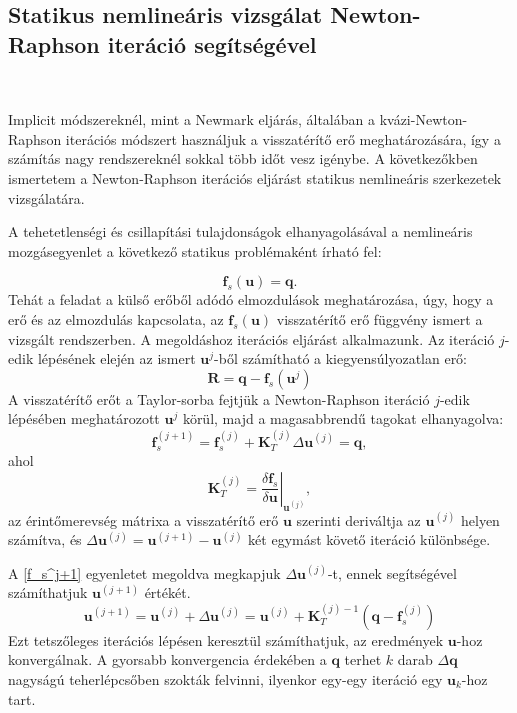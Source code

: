 \subsection{Statikus nemlineáris vizsgálat Newton-Raphson iteráció segítségével}

{\ }

 Implicit módszereknél, mint a Newmark eljárás, általában a kvázi-Newton-Raphson iterációs módszert \cite{chopra} használjuk a visszatérítő erő meghatározására, így a számítás nagy rendszereknél sokkal több időt vesz igénybe. A következőkben ismertetem a Newton-Raphson  iterációs eljárást statikus nemlineáris szerkezetek vizsgálatára.

A tehetetlenségi és csillapítási tulajdonságok elhanyagolásával a nemlineáris mozgásegyenlet a következő statikus problémaként írható fel:

\begin{equation*}
\mathbf{f}_s(\mathbf{u}) = \mathbf{q}.
\end{equation*}
Tehát a feladat a külső erőből adódó  elmozdulások meghatározása, úgy, hogy a erő és az elmozdulás kapcsolata, az $\mathbf{f}_s(\mathbf{u})$ visszatérítő erő függvény ismert a vizsgált rendszerben. A megoldáshoz iterációs eljárást alkalmazunk. Az iteráció $j$-edik lépésének elején  az ismert $\mathbf{u}^j$-ből számítható a kiegyensúlyozatlan erő:
\begin{equation*}
\mathbf{R} = \mathbf{q}-\mathbf{f}_s(\mathbf{u}^j)
\end{equation*}
 A visszatérítő erőt a   Taylor-sorba fejtjük a Newton-Raphson iteráció $j$-edik lépésében meghatározott $\mathbf{u}^j$ körül, majd a magasabbrendű tagokat elhanyagolva:
\begin{equation}
\label{f_s^j+1}
\mathbf{f}_s^{(j+1)} = \mathbf{f}_s^{(j)}+\mathbf{K}_T^{(j)}\Delta{\mathbf{u}}^{(j)} = \mathbf{q},
\end{equation}
ahol 
\begin{equation*}
\mathbf{K}_T^{(j)} = \left. \frac{\delta\mathbf{f}_s}{\delta\mathbf{u}} \right|_{\mathbf{u}^{(j)}},
\end{equation*}
az érintőmerevség mátrixa a visszatérítő erő $\mathbf{u}$ szerinti deriváltja az $\mathbf{u}^{(j)}$ helyen számítva, és $\Delta{\mathbf{u}}^{(j)} = \mathbf{u}^{(j+1)}-\mathbf{u}^{(j)}$  két egymást követő iteráció különbsége.

A \eqref{f_s^j+1} egyenletet megoldva megkapjuk  $\Delta{\mathbf{u}}^{(j)}$-t, ennek segítségével számíthatjuk $\mathbf{u}^{(j+1)}$ értékét.
%
\begin{equation}
\label{NR_u_j+1}
\mathbf{u}^{(j+1)} = \mathbf{u}^{(j)}+\Delta{\mathbf{u}}^{(j)} =  \mathbf{u}^{(j)}+\mathbf{K}_T^{(j)-1}(\mathbf{q}-\mathbf{f}_s^{(j)})
\end{equation}
Ezt tetszőleges iterációs lépésen keresztül számíthatjuk, az eredmények $\mathbf{u}$-hoz konvergálnak.  A gyorsabb konvergencia érdekében  a $\mathbf{q}$ terhet  $k$ darab $\Delta{\mathbf{q}}$ nagyságú teherlépcsőben szokták felvinni, ilyenkor egy-egy iteráció egy $\mathbf{u}_k$-hoz tart.

